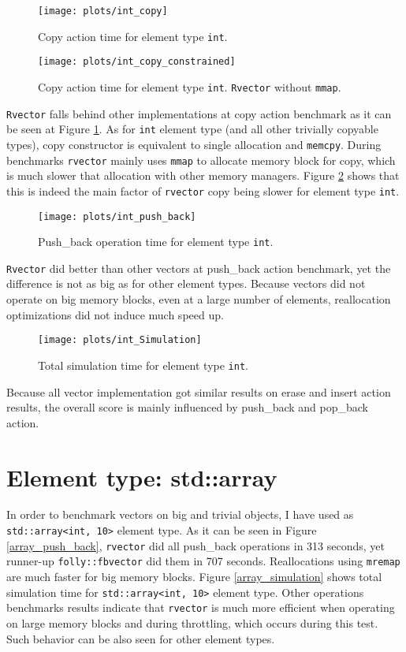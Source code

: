 \documentclass[inz, english, shortabstract]{iithesis}
\begin{document}
\begin{figure}[h!]
\texttt{[image: plots/int\_copy]}
\caption{Copy action time for element type \lstinline{int}.}
\label{int_copy}
\end{figure}

\begin{figure}[h!]
\texttt{[image: plots/int\_copy\_constrained]}
\caption{Copy action time for element type \lstinline{int}. {\tt Rvector} without {\tt mmap}.}
\label{int_copy_constrained}
\end{figure}

{\tt Rvector} falls behind other implementations at copy action benchmark as it can be seen at Figure \ref{int_copy}. As for \lstinline{int} element type (and all other trivially copyable types), copy constructor is equivalent to single allocation and {\tt memcpy}. During benchmarks {\tt rvector} mainly uses {\tt mmap} to allocate memory block for copy, which is much slower that allocation with other memory managers. Figure \ref{int_copy_constrained} shows that this is indeed the main factor of {\tt rvector} copy being slower for element type \lstinline{int}.

\begin{figure}[h!]
\texttt{[image: plots/int\_push\_back]}
\caption{Push\_back operation time for element type \lstinline{int}.}
\label{int_push_back}
\end{figure}

{\tt Rvector} did better than other vectors at push\_back action benchmark, yet the difference is not as big as for other element types. Because vectors did not operate on big memory blocks, even at a large number of elements, reallocation optimizations did not induce much speed up.

\begin{figure}[h!]
\texttt{[image: plots/int\_Simulation]}
\caption{Total simulation time for element type \lstinline{int}.}
\label{int_simulation}
\end{figure}

Because all vector implementation got similar results on erase and insert action results, the overall score is mainly influenced by push\_back and pop\_back action.
\clearpage
\section{Element type: std::array}
In order to benchmark vectors on big and trivial objects, I have used as \lstinline{std::array<int, 10>} element type. As it can be seen in Figure \ref{array_push_back}, {\tt rvector} did all push\_back operations in 313 seconds, yet runner-up {\tt folly::fbvector} did them in 707 seconds. Reallocations using {\tt mremap} are much faster for big memory blocks. Figure \ref{array_simulation} shows total simulation time for \lstinline{std::array<int, 10>} element type. Other operations benchmarks results indicate that {\tt rvector} is much more efficient when operating on large memory blocks and during {throttling}, which occurs during this test. Such behavior can be also seen for other element types.
\end{document}
